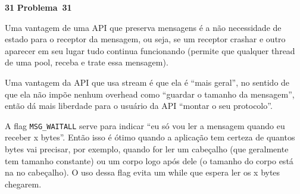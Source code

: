 \documentclass{article}
\newcounter{exe-list}
\newenvironment{exe}[2][Problema]
    {\newcommand{\opt}{(Opcional)}%
    \newcommand{\sketch}[1]{{\bfseries Rascunho:} ##1}%
    \medskip\par\noindent\ifthenelse{\equal{#1}{}}
        {\textbf{\large #2}}
        {\textbf{\large #1~#2}}%
    \medskip\par\noindent}
    {\medskip}
\begin{document}
\begin{exe}{31}
    Uma vantagem de uma API que preserva mensagens é
    a não necessidade de estado para o receptor da mensagem,
    ou seja, se um receptor crashar e
    outro aparecer em seu lugar tudo continua funcionando
    (permite que qualquer thread de uma pool,
    receba e trate essa mensagem).

    Uma vantagem da API que usa stream é que
    ela é ``mais geral'',
    no sentido de que ela não impõe nenhum overhead
    como ``guardar o tamanho da mensagem'',
    então dá mais liberdade para o usuário
    da API ``montar o seu protocolo''.

    A flag \verb.MSG_WAITALL. serve para indicar
    ``eu só vou ler a mensagem quando eu receber x bytes''.
    Então isso é ótimo quando a aplicação tem certeza
    de quantos bytes vai precisar,
    por exemplo,
    quando for ler um cabeçalho
    (que geralmente tem tamanho constante)
    ou um corpo logo após dele
    (o tamanho do corpo está na no cabeçalho).
    O uso dessa flag evita um while
    que espera ler os x bytes chegarem.
\end{exe}
\end{document}
